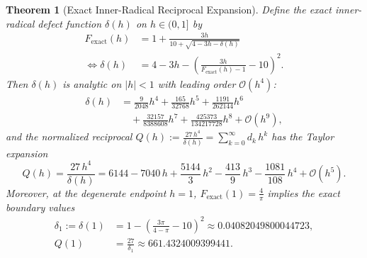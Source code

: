 \documentclass[11pt,a4paper]{article}
\theoremstyle{spacious}
\newtheorem{theorem}{Theorem}[section]
\theoremstyle{spaciousdef}
\begin{document}
\begin{theorem}[Exact Inner-Radical Reciprocal Expansion]\label{thm:inner_reciprocal}
Define the exact inner-radical defect function $\delta(h)$ on $h \in (0, 1]$ by
\begin{equation}\label{eq:delta_def}
\begin{aligned}
F_{\text{exact}}(h) &= 1 + \frac{3h}{10 + \sqrt{4 - 3h - \delta(h)}} \\
\iff \delta(h) &= 4 - 3h - \left(\frac{3h}{F_{\text{exact}}(h) - 1} - 10\right)^{\!2}.
\end{aligned}
\end{equation}
Then $\delta(h)$ is analytic on $|h| < 1$ with leading order $\mathcal{O}(h^4)$:
\begin{equation}\label{eq:delta_series}
\begin{aligned}
\delta(h) &= \frac{9}{2048}h^4 + \frac{165}{32768}h^5 + \frac{1191}{262144}h^6 \\
&\quad + \frac{32157}{8388608}h^7 + \frac{425373}{134217728}h^8 + \mathcal{O}(h^9),
\end{aligned}
\end{equation}
and the normalized reciprocal $Q(h) := \frac{27\,h^4}{\delta(h)} = \sum_{k=0}^{\infty} d_k\,h^k$ has the Taylor expansion
\begin{equation}\label{eq:Q_series}
Q(h) = \frac{27\,h^4}{\delta(h)} = 6144 - 7040\,h + \frac{5144}{3}\,h^2 - \frac{413}{9}\,h^3 - \frac{1081}{108}\,h^4 + \mathcal{O}(h^5).
\end{equation}
Moreover, at the degenerate endpoint $h = 1$, $F_{\text{exact}}(1) = \frac{4}{\pi}$ implies the exact boundary values
\begin{equation}\label{eq:delta1_Q1}
\begin{aligned}
\delta_1 := \delta(1) &= 1 - \left(\frac{3\pi}{4 - \pi} - 10\right)^{\!2} \approx 0.04082049800044723, \\
Q(1) &= \frac{27}{\delta_1} \approx 661.4324009399441.
\end{aligned}
\end{equation}
\end{theorem}
\end{document}
